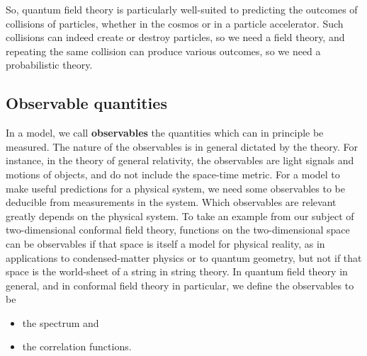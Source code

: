 \documentclass[12pt,a4paper,notitlepage]{report}
\numberwithin{equation}{section}
\newcommand{\term}[1]{\textbf{\boldmath #1}\index{#1}}
\theoremstyle{break}
\begin{document}
So, quantum field theory is particularly well-suited to predicting the outcomes of collisions of particles, whether in the cosmos or in a particle accelerator.
Such collisions can indeed create or destroy particles, so we need a field theory, and repeating the same collision can produce various outcomes, so we need a probabilistic theory. 

\subsection{Observable quantities}

In a model, we call \term{observables} the quantities which can in principle be measured.
The nature of the observables is in general dictated by the theory.
For instance, in the theory of general relativity, the observables are light signals and motions of objects, and do not include the space-time metric.
For a model to make useful predictions for a physical system, we need some observables to be deducible from measurements in the system.
Which observables are relevant greatly depends on the physical system.
To take an example from our subject of two-dimensional conformal field theory, functions on the two-dimensional space can be observables if that space is itself a model for physical reality, as in applications to condensed-matter physics or to quantum geometry, but not if that space is the world-sheet of a string in string theory. 
In quantum field theory in general, and in conformal field theory in particular, we define the observables to be 
\begin{itemize}
 \item the spectrum and
\item the correlation functions.
\end{itemize}
\end{document}
